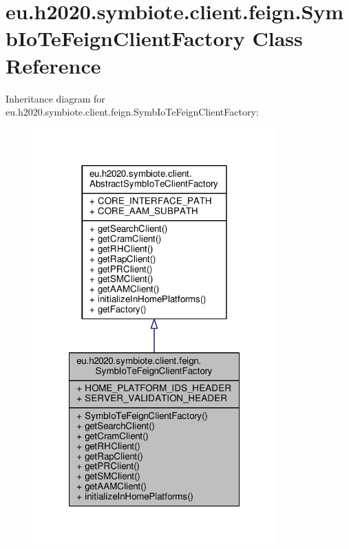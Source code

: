 \hypertarget{classeu_1_1h2020_1_1symbiote_1_1client_1_1feign_1_1SymbIoTeFeignClientFactory}{}\section{eu.\+h2020.\+symbiote.\+client.\+feign.\+Symb\+Io\+Te\+Feign\+Client\+Factory Class Reference}
\label{classeu_1_1h2020_1_1symbiote_1_1client_1_1feign_1_1SymbIoTeFeignClientFactory}


Inheritance diagram for eu.\+h2020.\+symbiote.\+client.\+feign.\+Symb\+Io\+Te\+Feign\+Client\+Factory\+:
\nopagebreak
\begin{figure}[H]
\begin{center}
\leavevmode
\includegraphics[width=264pt]{classeu_1_1h2020_1_1symbiote_1_1client_1_1feign_1_1SymbIoTeFeignClientFactory__inherit__graph}
\end{center}
\end{figure}


